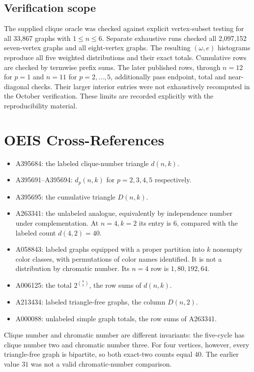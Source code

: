 \documentclass[11pt,a4paper]{article}
\theoremstyle{definition}
\begin{document}
\subsection{Verification scope}
The supplied clique oracle was checked against explicit vertex-subset
testing for all 33,867 graphs with $1\leq n\leq6$. Separate exhaustive
runs checked all 2,097,152 seven-vertex graphs and all eight-vertex
graphs. The resulting $(\omega,e)$ histograms reproduce all five
weighted distributions and their exact totals. Cumulative rows are
checked by termwise prefix sums.
The later published rows, through $n=12$ for $p=1$ and $n=11$ for
$p=2,\ldots,5$, additionally pass endpoint, total and near-diagonal
checks. Their larger interior entries were not exhaustively recomputed
in the October verification. These limits are recorded explicitly
with the reproducibility material.

\section{OEIS Cross-References}
\begin{itemize}
\item A395684: the labeled clique-number triangle $d(n,k)$.
\item A395691--A395694: $d_p(n,k)$ for $p=2,3,4,5$ respectively.
\item A395695: the cumulative triangle $D(n,k)$.
\item A263341: the unlabeled analogue, equivalently by independence
number under complementation. At $n=4,k=2$ its entry is $6$, compared
with the labeled count $d(4,2)=40$.
\item A058843: labeled graphs equipped with a proper partition into
$k$ nonempty color classes, with permutations of color names
identified. It is not a distribution by chromatic number. Its
$n=4$ row is $1,80,192,64$.
\item A006125: the total $2^{\binom n2}$, the row sums of $d(n,k)$.
\item A213434: labeled triangle-free graphs, the column $D(n,2)$.
\item A000088: unlabeled simple graph totals, the row sums of A263341.
\end{itemize}
Clique number and chromatic number are different invariants: the
five-cycle has clique number two and chromatic number three. For
four vertices, however, every triangle-free graph is bipartite, so
both exact-two counts equal $40$. The earlier value $31$ was not a
valid chromatic-number comparison.
\end{document}
